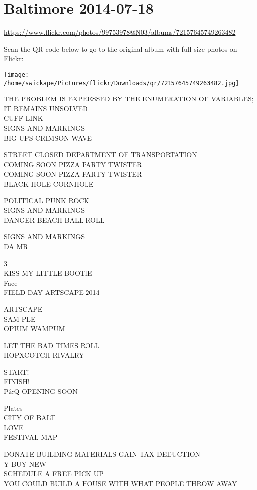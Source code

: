 \documentclass[10pt,letterpaper]{article}
\begin{document}
\section*{Baltimore 2014-07-18}

\url{https://www.flickr.com/photos/99753978@N03/albums/72157645749263482}

Scan the QR code below to go to the original album with full-size photos on Flickr:

\texttt{[image: /home/swickape/Pictures/flickr/Downloads/qr/72157645749263482.jpg]}


THE PROBLEM IS EXPRESSED BY THE ENUMERATION OF VARIABLES; IT REMAINS UNSOLVED\\
CUFF LINK\\
SIGNS AND MARKINGS\\
BIG UPS CRIMSON WAVE

STREET CLOSED DEPARTMENT OF TRANSPORTATION\\
COMING SOON PIZZA PARTY TWISTER\\
COMING SOON PIZZA PARTY TWISTER\\
BLACK HOLE CORNHOLE

POLITICAL PUNK ROCK\\
SIGNS AND MARKINGS\\
DANGER BEACH BALL ROLL

SIGNS AND MARKINGS\\
DA MR

3\\
KISS MY LITTLE BOOTIE\\
Face\\
FIELD DAY ARTSCAPE 2014

ARTSCAPE\\
SAM PLE\\
OPIUM WAMPUM

LET THE BAD TIMES ROLL\\
HOPXCOTCH RIVALRY

START!\\
FINISH!\\
P\&Q OPENING SOON

Plates\\
CITY OF BALT\\
LOVE\\
FESTIVAL MAP

DONATE BUILDING MATERIALS GAIN TAX DEDUCTION\\
Y{-}BUY{-}NEW\\
SCHEDULE A FREE PICK UP\\
YOU COULD BUILD A HOUSE WITH WHAT PEOPLE THROW AWAY
\end{document}
